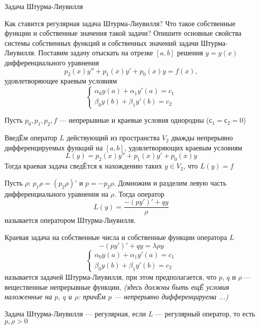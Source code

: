\documentclass{article}
\begin{document}

\begin{section}{Задача Штурма-Лиувилля}


\begin{subsection}{Как ставится регулярная задача Штурма-Лиувилля? Что такое собственные функции и собственные значения такой задачи? Опишите основные свойства системы собственных функций и собственных значений задачи Штурма-Лиувилля.}
Поставим задачу отыскать на отрезке $ [a, b] $ решения $ y = y(x)$ дифференциального уравнения 
\[ p_2(x)y'' + p_1(x)y' + p_0(x)y = f(x), \]
удовлетворяющее краевым условиям 
\[ \left\{\begin{matrix}
	\alpha_0 y(a) + \alpha_1 y'(a) = c_1\\ 
	\beta_0 y(b) + \beta_1 y'(b) = c_2
\end{matrix}\right. \]

Пусть $ p_0, p_1, p_2, f $ --- непрерывные и краевые условия однородны ($ с_1 = с_2 = 0 $)

Введ{\footnotesize Ё}м оператор $ L $ действующий из пространства $V_2$ дважды непрерывно дифференцируемых функций на $ [a, b] $, удовлетворяющих краевым условиям 
\[ L(y) = p_2(x)y'' + p_1(x)y' + p_0(x)y \]
Тогда краевая задача свед{\footnotesize Ё}тся к нахождению таких $ y \in V_2 $, что $ L(y) = f $

Пусть $ \rho $: $ p_1 \rho = (p_2 \rho)'$ и $p = -p_2 \rho$. Домножим и разделим левую часть дифференциального уравнения на $\rho$. Тогда оператор  
\[ L(y) = \frac{-(py')' + qy}{\rho} \]
называется оператором Штурма-Лиувилля. 

Краевая задача на собственные числа и собственные функции оператора $L$
\[ -(py')' + qy = \lambda \rho y \]
\[ \left\{\begin{matrix}
	\alpha_0 y(a) + \alpha_1 y'(a) = c_1\\ 
	\beta_0 y(b) + \beta_1 y'(b) = c_2
\end{matrix}\right. \]
называется задачей Штурма-Лиувилля, при этом предполагается, что $ p $, $ q $ и $ \rho $ --- вещественные непрерывные функции, \textit{(здесь должны быть ещ{\footnotesize Ё} условия наложенные на $ p $, $ q $ и $ \rho $:  прич{\footnotesize Ё}м $ p $ --- непрерывно дифференцируема ...) }

Задача Штурма-Лиувилля --- регулярная, если $L$ --- регулярный оператор, то есть $p, \rho > 0$


\end{subsection}
\end{section}
\end{document}
